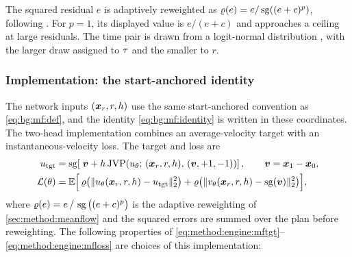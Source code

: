 The squared residual $e$ is adaptively reweighted as
$\varrho(e)=e/\operatorname{sg}((e+c)^{p})$, following \parencite[Sec.~4.3]{geng2025meanflow}.
For $p=1$, its displayed value is $e/(e+c)$ and approaches a ceiling at large residuals.
The time pair is drawn from a logit-normal distribution \parencite{esser2024scaling}, with the
larger draw assigned to $\tau$ and the smaller to $r$.

\subsubsection*{Implementation: the start-anchored identity}

The network inputs $(\boldsymbol{x}_{r},r,h)$ use the same start-anchored convention as
\eqref{eq:bg:mf:def}, and the identity \eqref{eq:bg:mf:identity} is written in these coordinates.
The two-head implementation combines an average-velocity target with an instantaneous-velocity
loss. The target and loss are
\begin{align}
  u_{\textrm{tgt}}
    &= \operatorname{sg}\!\left[\;\boldsymbol{v} + h\,
       \mathrm{JVP}\!\left(u_{\theta};\,
         (\boldsymbol{x}_{r},r,h),\,(\boldsymbol{v},+1,-1)\right)\right],
       \qquad \boldsymbol{v} = \boldsymbol{x}_{1}-\boldsymbol{x}_{0},
       \label{eq:method:engine:mftgt}\\
  \mathcal{L}(\theta)
    &= \mathbb{E}\Big[\,
        \varrho\big(\|u_{\theta}(\boldsymbol{x}_{r},r,h) - u_{\textrm{tgt}}\|_{2}^{2}\big)
      + \varrho\big(\|v_{\theta}(\boldsymbol{x}_{r},r,h) - \operatorname{sg}(\boldsymbol{v})\|_{2}^{2}\big)\Big],
       \label{eq:method:engine:mfloss}
\end{align}
where $\varrho(e) = e\,/\,\operatorname{sg}\big((e+c)^{p}\big)$ is the adaptive reweighting of
\autoref{sec:method:meanflow} and the squared errors are summed over the plan before reweighting.
The following properties of \eqref{eq:method:engine:mftgt}--\eqref{eq:method:engine:mfloss} are choices of
this implementation:

